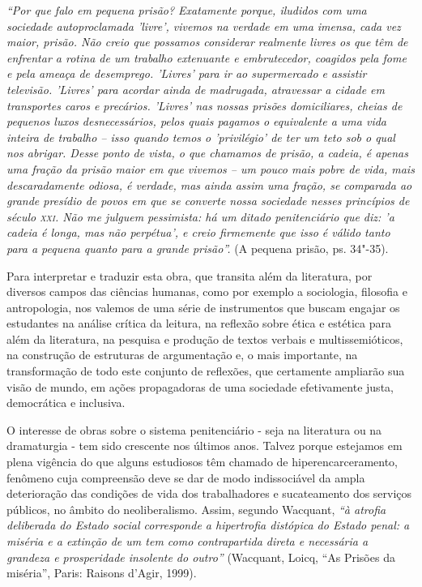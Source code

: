 \documentclass[11pt]{extarticle}
\begin{document}
\emph{``Por que falo em pequena prisão? Exatamente porque, iludidos com
uma sociedade autoproclamada 'livre', vivemos na verdade em uma
imensa, cada vez maior, prisão. Não creio que possamos considerar
realmente livres os que têm de enfrentar a rotina de um trabalho
extenuante e embrutecedor, coagidos pela fome e pela ameaça de
desemprego. 'Livres' para ir ao supermercado e assistir televisão.
'Livres' para acordar ainda de madrugada, atravessar a cidade em
transportes caros e precários. 'Livres' nas nossas prisões
domiciliares, cheias de pequenos luxos desnecessários, pelos quais
pagamos o equivalente a uma vida inteira de trabalho -- isso quando
temos o 'privilégio' de ter um teto sob o qual nos abrigar. Desse
ponto de vista, o que chamamos de prisão, a cadeia, é apenas uma fração
da prisão maior em que vivemos -- um pouco mais pobre de vida, mais
descaradamente odiosa, é verdade, mas ainda assim uma fração, se
comparada ao grande presídio de povos em que se converte nossa sociedade
nesses princípios de século \textsc{xxi}. Não me julguem pessimista: há um ditado
penitenciário que diz: 'a cadeia é longa, mas não perpétua', e creio
firmemente que isso é válido tanto para a pequena quanto para a grande
prisão''.} (A pequena prisão, ps. 34"-35).

Para interpretar e traduzir esta obra, que transita além da literatura,
por diversos campos das ciências humanas, como por exemplo a sociologia,
filosofia e antropologia, nos valemos de uma série de instrumentos que
buscam engajar os estudantes na análise crítica da leitura, na reflexão
sobre ética e estética para além da literatura, na pesquisa e produção
de textos verbais e multissemióticos, na construção de estruturas de
argumentação e, o mais importante, na transformação de todo este
conjunto de reflexões, que certamente ampliarão sua visão de mundo, em
ações propagadoras de uma sociedade efetivamente justa, democrática e
inclusiva.

O interesse de obras sobre o sistema penitenciário - seja na literatura
ou na dramaturgia - tem sido crescente nos últimos anos. Talvez porque
estejamos em plena vigência do que alguns estudiosos têm chamado de
hiperencarceramento, fenômeno cuja compreensão deve se dar de modo
indissociável da ampla deterioração das condições de vida dos
trabalhadores e sucateamento dos serviços públicos, no âmbito do
neoliberalismo. Assim, segundo Wacquant, \emph{``à atrofia deliberada do
Estado social corresponde a hipertrofia distópica do Estado penal: a
miséria e a extinção de um tem como contrapartida direta e necessária a
grandeza e prosperidade insolente do outro''} (Wacquant, Loicq, ``As
Prisões da miséria'', Paris: Raisons d'Agir, 1999).
\end{document}
